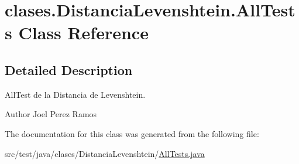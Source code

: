 \hypertarget{classclases_1_1_distancia_levenshtein_1_1_all_tests}{}\section{clases.\+Distancia\+Levenshtein.\+All\+Tests Class Reference}
\label{classclases_1_1_distancia_levenshtein_1_1_all_tests}


\subsection{Detailed Description}
All\+Test de la Distancia de Levenshtein. \begin{DoxyAuthor}{Author}
Joel Perez Ramos 
\end{DoxyAuthor}


The documentation for this class was generated from the following file\+:\begin{DoxyCompactItemize}
\item 
src/test/java/clases/\+Distancia\+Levenshtein/\hyperlink{_all_tests_8java}{All\+Tests.\+java}\end{DoxyCompactItemize}
